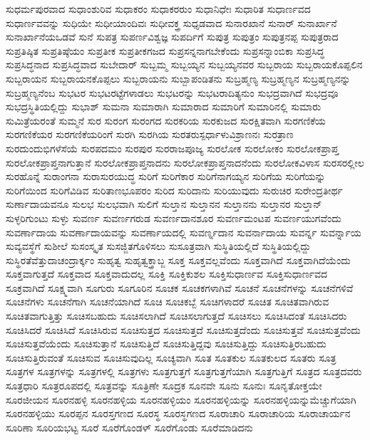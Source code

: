 {ಸುಧರ್ಮಪುರವಾದ
ಸುಧಾಂಶುರಿವ
ಸುಧಾಕರಂ
ಸುಧಾಕರರುಂ
ಸುಧಾನಿಧೇಃ
ಸುಧಾರಿತ
ಸುಧಾರ್ಣವದ
ಸುಧಾರ್ಣವವನ್ನು
ಸುಧಿಯೇ
ಸುಧೀಯಾಂದಿವಃ
ಸುಧೀವಕ್ತ್ರ
ಸುಧೃಡವಾದ
ಸುನಾರಖಾನೆ
ಸುನಾರ್
ಸುನಾರ್ಖಾನೆ
ಸುನಾರ್ಖಾನೆಯಒಡವೆ
ಸುನೆ
ಸುಪತ್ರ
ಸುಪರ್ಣವಿಶ್ವಜ್ಞ
ಸುಪರ್ದಿಗೆ
ಸುಪುತ್ರ
ಸುಪುತ್ರಂ
ಸುಪುತ್ರನಪ್ಪ
ಸುಪುತ್ರರಾದ
ಸುಪ್ರತಿಷ್ಠಿತ
ಸುಪ್ರತಿಷ್ಠೆಯಂ
ಸುಪ್ರತೀಕ
ಸುಪ್ರತೀಕಗಜದ
ಸುಪ್ರಸನ್ನನಾಗಬೇಕೆಂದು
ಸುಪ್ರಸನ್ನಾಂಬಿಕಾ
ಸುಪ್ರಸಿದ್ಧ
ಸುಪ್ರಸಿದ್ಧನಾದ
ಸುಪ್ರಸಿದ್ಧವಾದ
ಸುಬೇದಾರ್
ಸುಬ್ಬಮ್ಮ
ಸುಬ್ಬಯ್ಯನ
ಸುಬ್ಬಯ್ಯನವರ
ಸುಬ್ಬರಾಯ
ಸುಬ್ಬರಾಯಕೊಪ್ಪಲಿನ
ಸುಬ್ಬರಾಯನ
ಸುಬ್ಬರಾಯನಕೊಪ್ಪಲು
ಸುಬ್ಬರಾಯನು
ಸುಬ್ಬಾಪಂಡಿತನು
ಸುಬ್ರಹ್ಮಣ್ಯ
ಸುಬ್ರಹ್ಮಣ್ಯನ
ಸುಬ್ರಹ್ಮಣ್ಯನನ್ನು
ಸುಬ್ರಹ್ಮಣ್ಯನೆಂಬ
ಸುಭಟರ
ಸುಭಟರಟ್ಟೆಗಳಾಡಲು
ಸುಭಟರನ್ನು
ಸುಭಟರಾದಿತ್ಯನುಂ
ಸುಭದ್ರವಾಗಿದೆ
ಸುಭದ್ರವೂ
ಸುಭದ್ರಸ್ಥಿತಿಯಲ್ಲಿದ್ದು
ಸುಭಾಶ್
ಸುಮನಾ
ಸುಮಾರಾಗಿ
ಸುಮಾರಾದ
ಸುಮಾರಿಗೆ
ಸುಮಾರಿನಲ್ಲಿ
ಸುಮಾರು
ಸುಮಿತ್ರೆಯರಂತೆ
ಸುಮ್ಮನೆ
ಸುರ
ಸುರಂಗ
ಸುರಂಗದ
ಸುರಕರಿಯ
ಸುರಕುಜದ
ಸುರಕ್ಷಿತವಾಗಿ
ಸುರಗಣಿಕೆಯ
ಸುರಗಣಿಕೆಯರ
ಸುರಗಣಿಕೆಯರಿಂಗೆ
ಸುರಗಿ
ಸುರಗಿಯ
ಸುರತರುಸ್ಪರ್ಧಾಳುವಿಶ್ರಾಣನಃ
ಸುರತ್ರಾಣ
ಸುರದುಂದುಭಿಗಳೆಸೆಯೆ
ಸುರಪದಮಂ
ಸುರಪುರ
ಸುರರಾಜಪೂಜ್ಯ
ಸುರಲೋಕ
ಸುರಲೋಕಂ
ಸುರಲೋಕಪ್ರಾಪ್ತ
ಸುರಲೋಕಪ್ರಾಪ್ತನಾಗುತ್ತಾನೆ
ಸುರಲೋಕಪ್ರಾಪ್ತನಾದನು
ಸುರಲೋಕಪ್ರಾಪ್ತನಾದನೆಂದು
ಸುರಲೋಕವಿಳಾಸ
ಸುರಸರಲ್ಲೀಲ
ಸುರಹೊನ್ನೆ
ಸುರಾಂಗನಾ
ಸುರಾಸುರಯುದ್ಧ
ಸುರಿಗೆ
ಸುರಿಗೆಕಾರ
ಸುರಿಗೆನಾಗಯ್ಯನ
ಸುರಿಗೆಯ
ಸುರಿಗೆಯನ್ನು
ಸುರಿಗೆಯಿಂದ
ಸುರಿಗೆವಿಡಿವ
ಸುರಿತಾಣಭೂಪರಂ
ಸುರಿದ
ಸುರಿದಾನು
ಸುರಿಯುವುದು
ಸುರುಚಿರ
ಸುರೇಂದ್ರತೀರ್ಥ
ಸುರ್ಣಾದಾಯವನೂ
ಸುಲಭ
ಸುಲಭವಾಗಿ
ಸುಲಿಗೆ
ಸುಲ್ತಾನ
ಸುಲ್ತಾನನ
ಸುಲ್ತಾನನು
ಸುಲ್ತಾನರ
ಸುಲ್ತಾನ್
ಸುಳ್ಳರಿಗುಂಟು
ಸುಳ್ಳು
ಸುವರ್ಣ
ಸುವರ್ಣಗರುಡ
ಸುವರ್ಣದಾನಶೂರ
ಸುವರ್ಣಮಂಟಪ
ಸುವರ್ಣಯುಗವೆಂದು
ಸುವರ್ಣಾದಾಯ
ಸುವರ್ಣಾದಾಯವನ್ನು
ಸುವರ್ಣಾಯದಲ್ಲಿ
ಸುವರ್ಣ್ನದಾನ
ಸುವರ್ನಾದಾಯ
ಸುವರ್ನ್ನ
ಸುವರ್ನ್ನಾಯ
ಸುವ್ಯವಸ್ಥೆಗೆ
ಸುಶೀಲೆ
ಸುಸಂಸ್ಕೃತ
ಸುಸಜ್ಜಿತಗೊಳಿಸಲು
ಸುಸೂತ್ರವಾಗಿ
ಸುಸ್ಥಿತಿಯಲ್ಲಿದೆ
ಸುಸ್ಥಿತಿಯಲ್ಲಿದ್ದು
ಸುಸ್ಥಿರತೆವೆತ್ತುದಾಚಂದ್ರಾರ್ಕ್ಕಂ
ಸುಹೃತ್ವ
ಸುಹೃತ್ವಕ್ತ್ರಾಬ್ಜ
ಸೂಕ್ತ
ಸೂಕ್ತವಲ್ಲವೆಂದು
ಸೂಕ್ತವಾಗಿದೆ
ಸೂಕ್ತವಾಗಿದೆಯೆಂದು
ಸೂಕ್ತವಾಗುತ್ತದೆ
ಸೂಕ್ತವಾದ
ಸೂಕ್ತವಾದುದಲ್ಲ
ಸೂಕ್ತಿ
ಸೂಕ್ತಿಕುಶಲ
ಸೂಕ್ತಿಸುಧಾರ್ಣವ
ಸೂಕ್ತಿಸುಧಾರ್ಣವದ
ಸೂಕ್ರವಾಗಿದೆ
ಸೂಕ್ಷ್ಮವಾಗಿ
ಸೂಗುರು
ಸೂಗೂರಿನ
ಸೂಚಕ
ಸೂಚಕಗಳಾಗಿವೆ
ಸೂಚನೆ
ಸೂಚನೆಗಳನ್ನು
ಸೂಚನೆಗಳಿವೆ
ಸೂಚನೆಗಳು
ಸೂಚನೆಗಾಗಿ
ಸೂಚನೆಯಾಗಿದೆ
ಸೂಚಿ
ಸೂಚಿಕಬ್ಬೆ
ಸೂಚಿಗಳಾದರೆ
ಸೂಚಿತ
ಸೂಚಿತವಾಗಿರುವ
ಸೂಚಿತವಾಗುತ್ತಿತ್ತು
ಸೂಚಿಸಬಹುದು
ಸೂಚಿಸಲಾಗಿದೆ
ಸೂಚಿಸಲಾಗುತ್ತದೆ
ಸೂಚಿಸಲು
ಸೂಚಿಸಿದಂತೆ
ಸೂಚಿಸಿದರು
ಸೂಚಿಸಿದರೆ
ಸೂಚಿಸಿದೆ
ಸೂಚಿಸಿರುವ
ಸೂಚಿಸುತ್ತದ
ಸೂಚಿಸುತ್ತದೆ
ಸೂಚಿಸುತ್ತದೆಂದು
ಸೂಚಿಸುತ್ತವೆ
ಸೂಚಿಸುತ್ತವೆಂದು
ಸೂಚಿಸುತ್ತವೆಯೆಂದು
ಸೂಚಿಸುತ್ತಾನೆ
ಸೂಚಿಸುತ್ತಿದೆ
ಸೂಚಿಸುತ್ತಿದ್ದವು
ಸೂಚಿಸುತ್ತಿದ್ದು
ಸೂಚಿಸುತ್ತಿರಬಹುದು
ಸೂಚಿಸುತ್ತಿರುವಂತೆ
ಸೂಚಿಸುವ
ಸೂಚಿಸುವುದಿಲ್ಲ
ಸೂಚ್ಯವಾಗಿ
ಸೂತ
ಸೂತಕುಲ
ಸೂತಕುಲದ
ಸೂತರು
ಸೂತ್ರ
ಸೂತ್ರಗಳ
ಸೂತ್ರಗಳನ್ನು
ಸೂತ್ರಗಳಲ್ಲಿ
ಸೂತ್ರಗಳು
ಸೂತ್ರಗುತ್ತಗೆ
ಸೂತ್ರಗುತ್ತಗೆಯಾಗಿ
ಸೂತ್ರಗುತ್ತಿಗೆ
ಸೂತ್ರದ
ಸೂತ್ರದವರು
ಸೂತ್ರಧಾರಿ
ಸೂತ್ರರೂಪದಲ್ಲಿ
ಸೂತ್ರವನ್ನು
ಸೂತ್ರಿಣೇ
ಸೂದ್ರಕ
ಸೂನವೇ
ಸೂನು
ಸೂನುಃ
ಸೂನೃತೋಕ್ತಯೇ
ಸೂರಜೀಯನ
ಸೂರನಹಳ್ಳಿ
ಸೂರನಹಳ್ಳಿಯ
ಸೂರನಹಳ್ಳಿಯಂ
ಸೂರನಹಳ್ಳಿಯನ್ನು
ಸೂರನಹಳ್ಳಿಯನ್ನುಮೆಚ್ಚುಗೆಯಾಗಿ
ಸೂರನಹಳ್ಳಿಯು
ಸೂರಪ್ಪನ
ಸೂರಸ್ತಗಣದ
ಸೂರಸ್ಥ
ಸೂರಸ್ಥಗಣದ
ಸೂರಾಚಾರಿ
ಸೂರಾಚಾರಿಯ
ಸೂರಾಚಾರ್ಯನ
ಸೂರಿಣಾ
ಸೂರಿಯಭಟ್ಟ
ಸೂರೆ
ಸೂರೆಗೊಂಡಳ್
ಸೂರೆಗೊಂಡು
ಸೂರೆಮಾಡಿದನು
}
